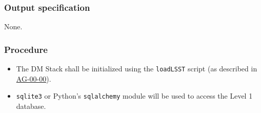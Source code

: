 \subsubsection{Output specification}

None.

\subsubsection{Procedure}

\begin{itemize}

  \item{The DM Stack shall be initialized using the \texttt{loadLSST} script
  (as described in \hyperref[ag-00-00]{AG-00-00}).}

  \item{\texttt{sqlite3} or Python's \texttt{sqlalchemy} module will be used
	  to access the Level 1 database.}

\end{itemize}
